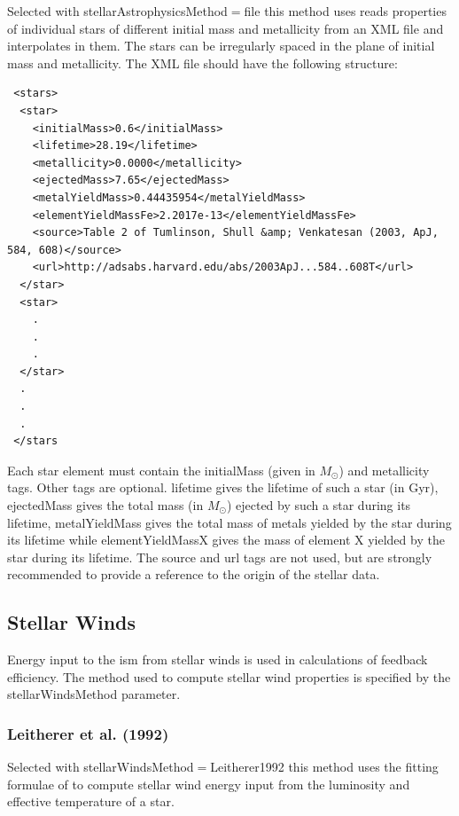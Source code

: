 Selected with {\normalfont \ttfamily stellarAstrophysicsMethod}$=${\normalfont \ttfamily file} this method uses reads properties of individual stars of different initial mass and metallicity from an XML file and interpolates in them. The stars can be irregularly spaced in the plane of initial mass and metallicity. The XML file should have the following structure:
\begin{verbatim}
 <stars>
  <star>
    <initialMass>0.6</initialMass>
    <lifetime>28.19</lifetime>
    <metallicity>0.0000</metallicity>
    <ejectedMass>7.65</ejectedMass>
    <metalYieldMass>0.44435954</metalYieldMass>
    <elementYieldMassFe>2.2017e-13</elementYieldMassFe>
    <source>Table 2 of Tumlinson, Shull &amp; Venkatesan (2003, ApJ, 584, 608)</source>
    <url>http://adsabs.harvard.edu/abs/2003ApJ...584..608T</url>
  </star>
  <star>
    .
    .
    .
  </star>
  .
  .
  .
 </stars
\end{verbatim}
Each {\normalfont \ttfamily star} element must contain the {\normalfont \ttfamily initialMass} (given in $M_\odot$) and {\normalfont \ttfamily metallicity} tags. Other tags are optional. {\normalfont \ttfamily lifetime} gives the lifetime of such a star (in Gyr), {\normalfont \ttfamily ejectedMass} gives the total mass (in $M_\odot$) ejected by such a star during its lifetime, {\normalfont \ttfamily metalYieldMass} gives the total mass of metals yielded by the star during its lifetime while {\normalfont \ttfamily elementYieldMassX} gives the mass of element {\normalfont \ttfamily X} yielded by the star during its lifetime. The {\normalfont \ttfamily source} and {\normalfont \ttfamily url} tags are not used, but are strongly recommended to provide a reference to the origin of the stellar data.

\subsection{Stellar Winds}

Energy input to the \gls{ism} from stellar winds is used in calculations of feedback efficiency. The method used to compute stellar wind properties is specified by the {\normalfont \ttfamily stellarWindsMethod} parameter.

\subsubsection{Leitherer et al. (1992)}

Selected with {\normalfont \ttfamily stellarWindsMethod}$=${\normalfont \ttfamily Leitherer1992} this method uses the fitting formulae of \cite{leitherer_deposition_1992} to compute stellar wind energy input from the luminosity and effective temperature of a star.

